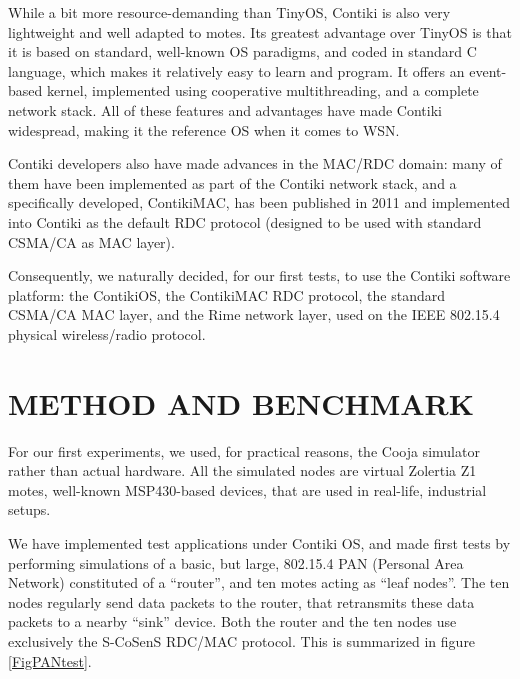 \documentclass[a4paper,twoside]{article}
\begin{document}
While a bit more resource-demanding than TinyOS, Contiki is also very
lightweight and well adapted to motes. Its greatest advantage over TinyOS
is that it is based on standard, well-known OS paradigms, and coded
in standard C language, which makes it relatively easy to learn and program.
It offers an event-based kernel, implemented using cooperative multithreading,
and a complete network stack. All of these features and advantages have made
Contiki widespread, making it the reference OS when it comes to WSN.

Contiki developers also have made advances in the MAC/RDC domain: many
of them have been implemented as part of the Contiki network stack, and
a specifically developed, ContikiMAC, has been published in 2011
\cite{ContikiMAC} and implemented into Contiki as the default
RDC protocol (designed to be used with standard CSMA/CA as MAC layer).

\medskip

Consequently, we naturally decided, for our first tests, to use the Contiki
software platform: the ContikiOS, the ContikiMAC RDC protocol, the standard
CSMA/CA MAC layer, and the Rime network layer, used on the IEEE 802.15.4
physical wireless/radio protocol.



\section{\uppercase{Method and Benchmark}}

For our first experiments, we used, for practical reasons, the Cooja
simulator rather than actual hardware. All the simulated nodes are
virtual Zolertia Z1 motes, well-known MSP430-based devices, that are
used in real-life, industrial setups.

We have implemented test applications under Contiki OS, and made first tests
by performing simulations of a basic, but large, 802.15.4 PAN (Personal Area
Network) constituted of a ``router'', and ten motes acting as ``leaf nodes''.
The ten nodes regularly send data packets to the router, that retransmits
these data packets to a nearby ``sink'' device. Both the router and the ten
nodes use exclusively the S-CoSenS RDC/MAC protocol. This is summarized
in figure \ref{FigPANtest}.
\end{document}
